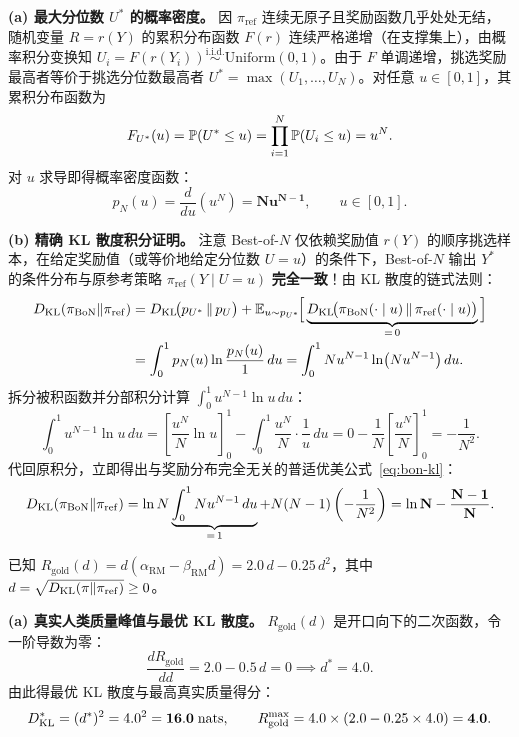 
\textbf{(a) 最大分位数 $U^*$ 的概率密度。} 因 $\pi_{\mathrm{ref}}$ 连续无原子且奖励函数几乎处处无结，随机变量 $R = r(Y)$ 的累积分布函数 $F(r)$ 连续严格递增（在支撑集上），由概率积分变换知 $U_i = F(r(Y_i)) \overset{\mathrm{i.i.d.}}{\sim} \mathrm{Uniform}(0, 1)$。由于 $F$ 单调递增，挑选奖励最高者等价于挑选分位数最高者 $U^* = \max(U_1, \dots, U_N)$。对任意 $u \in [0, 1]$，其累积分布函数为
\[
  F_{U^*}(u) = \mathbb{P}(U^* \le u) = \prod_{i=1}^N \mathbb{P}(U_i \le u) = u^N.
\]
对 $u$ 求导即得概率密度函数：
\[
  p_N(u) = \frac{d}{du}(u^N) = \mathbf{N u^{N-1}}, \qquad u \in [0, 1].
\]

\textbf{(b) 精确 KL 散度积分证明。} 注意 Best-of-$N$ 仅依赖奖励值 $r(Y)$ 的顺序挑选样本，在给定奖励值（或等价地给定分位数 $U = u$）的条件下，Best-of-$N$ 输出 $Y^*$ 的条件分布与原参考策略 $\pi_{\mathrm{ref}}(Y \mid U = u)$ \textbf{完全一致}！由 KL 散度的链式法则：
\begin{align*}
  D_{\mathrm{KL}}(\pi_{\mathrm{BoN}} \| \pi_{\mathrm{ref}})
  &= D_{\mathrm{KL}}\!\big(p_{U^*} \,\|\, p_U\big) + \mathbb{E}_{u \sim p_{U^*}}\!\Big[\underbrace{D_{\mathrm{KL}}\!\big(\pi_{\mathrm{BoN}}(\cdot \mid u) \,\|\, \pi_{\mathrm{ref}}(\cdot \mid u)\big)}_{=\,0}\Big] \\
  &= \int_0^1 p_N(u) \ln\frac{p_N(u)}{1}\,du
  = \int_0^1 N u^{N-1} \ln\!\big(N u^{N-1}\big)\,du.
\end{align*}
拆分被积函数并分部积分计算 $\int_0^1 u^{N-1}\ln u\,du$：
\[
  \int_0^1 u^{N-1} \ln u\,du
  = \left[\frac{u^N}{N}\ln u\right]_0^1 - \int_0^1 \frac{u^N}{N} \cdot \frac{1}{u}\,du
  = 0 - \frac{1}{N}\left[\frac{u^N}{N}\right]_0^1 = -\frac{1}{N^2}.
\]
代回原积分，立即得出与奖励分布完全无关的普适优美公式~\eqref{eq:bon-kl}：
\[
  D_{\mathrm{KL}}(\pi_{\mathrm{BoN}} \| \pi_{\mathrm{ref}})
  = \ln N \underbrace{\int_0^1 N u^{N-1}\,du}_{=\,1} + N(N - 1)\left(-\frac{1}{N^2}\right)
  = \mathbf{\ln N - \frac{N - 1}{N}}.
\]


已知 $R_{\mathrm{gold}}(d) = d(\alpha_{\mathrm{RM}} - \beta_{\mathrm{RM}} d) = 2.0\,d - 0.25\,d^2$，其中 $d = \sqrt{D_{\mathrm{KL}}(\pi \| \pi_{\mathrm{ref}})} \ge 0$。

\textbf{(a) 真实人类质量峰值与最优 KL 散度。} $R_{\mathrm{gold}}(d)$ 是开口向下的二次函数，令一阶导数为零：
\[
  \frac{d R_{\mathrm{gold}}}{d d} = 2.0 - 0.5\,d = 0 \implies d^* = \mathbf{4.0}.
\]
由此得最优 KL 散度与最高真实质量得分：
\[
  D_{\mathrm{KL}}^* = (d^*)^2 = 4.0^2 = \mathbf{16.0\;\text{nats}}, \qquad
  R_{\mathrm{gold}}^{\max} = 4.0 \times (2.0 - 0.25 \times 4.0) = \mathbf{4.0}.
\]

